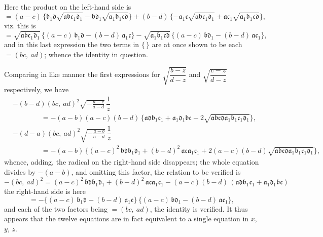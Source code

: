 \documentclass[11pt]{article}
\begin{document}
Here the product on the left-hand side is
\[ = (a-c)\,\{\mathfrak{b}_{1}\mathfrak{d}\sqrt{\mathfrak{a}\mathfrak{b}\mathfrak{c}_{1}\mathfrak{d}_{1}} - \mathfrak{b}\mathfrak{d}_{1}\sqrt{\mathfrak{a}_{1}\mathfrak{b}_{1}\mathfrak{c}\mathfrak{d}}\} + (b-d)\,\{-\mathfrak{a}_{1}\mathfrak{c}\sqrt{\mathfrak{a}\mathfrak{b}\mathfrak{c}_{1}\mathfrak{d}_{1}} + \mathfrak{a}\mathfrak{c}_{1}\sqrt{\mathfrak{a}_{1}\mathfrak{b}_{1}\mathfrak{c}\mathfrak{d}}\}, \]
viz. this is
\[ = \sqrt{\mathfrak{a}\mathfrak{b}\mathfrak{c}_{1}\mathfrak{d}_{1}}\,\{(a-c)\,\mathfrak{b}_{1}\mathfrak{d} - (b-d)\,\mathfrak{a}_{1}\mathfrak{c}\} - \sqrt{\mathfrak{a}_{1}\mathfrak{b}_{1}\mathfrak{c}\mathfrak{d}}\,\{(a-c)\,\mathfrak{b}\mathfrak{d}_{1} - (b-d)\,\mathfrak{a}\mathfrak{c}_{1}\}, \]
and in this last expression the two terms in $\{\,\}$ are at once shown to be each $= (bc,\ ad)$; whence the identity in question.

Comparing in like manner the first expressions for $\sqrt{\dfrac{b-z}{d-z}}$ and $\sqrt{\dfrac{c-z}{d-z}}$ respectively, we have
\begin{align*}
&-(b-d)(bc,\ ad)^{2}\sqrt{-\tfrac{a-c}{a-d}}\,\dfrac{1}{z}\\
&\hspace{4em}= -(a-b)(a-c)(b-d)\,\{\mathfrak{a}\mathfrak{d}\mathfrak{b}_{1}\mathfrak{c}_{1} + \mathfrak{a}_{1}\mathfrak{d}_{1}\mathfrak{b}\mathfrak{c} - 2\sqrt{\mathfrak{a}\mathfrak{b}\mathfrak{c}\mathfrak{d}\mathfrak{a}_{1}\mathfrak{b}_{1}\mathfrak{c}_{1}\mathfrak{d}_{1}}\},\\[2pt]
&-(d-a)(bc,\ ad)^{2}\sqrt{-\tfrac{a-b}{a-d}}\,\dfrac{1}{z}\\
&\hspace{4em}= -(a-b)\,\{(a-c)^{2}\,\mathfrak{b}\mathfrak{d}\mathfrak{b}_{1}\mathfrak{d}_{1} + (b-d)^{2}\,\mathfrak{a}\mathfrak{c}\mathfrak{a}_{1}\mathfrak{c}_{1} + 2(a-c)(b-d)\sqrt{\mathfrak{a}\mathfrak{b}\mathfrak{c}\mathfrak{d}\mathfrak{a}_{1}\mathfrak{b}_{1}\mathfrak{c}_{1}\mathfrak{d}_{1}}\},
\end{align*}
whence, adding, the radical on the right-hand side disappears; the whole equation divides by $-(a-b)$, and omitting this factor, the relation to be verified is
\[ -(bc,\ ad)^{2} = (a-c)^{2}\,\mathfrak{b}\mathfrak{d}\mathfrak{b}_{1}\mathfrak{d}_{1} + (b-d)^{2}\,\mathfrak{a}\mathfrak{c}\mathfrak{a}_{1}\mathfrak{c}_{1} - (a-c)(b-d)\,(\mathfrak{a}\mathfrak{d}\mathfrak{b}_{1}\mathfrak{c}_{1} + \mathfrak{a}_{1}\mathfrak{d}_{1}\mathfrak{b}\mathfrak{c}) \]
the right-hand side is here
\[ = -\{(a-c)\,\mathfrak{b}_{1}\mathfrak{d} - (b-d)\,\mathfrak{a}_{1}\mathfrak{c}\}\,\{(a-c)\,\mathfrak{b}\mathfrak{d}_{1} - (b-d)\,\mathfrak{a}\mathfrak{c}_{1}\}, \]
and each of the two factors being $= (bc,\ ad)$, the identity is verified. It thus appears that the twelve equations are in fact equivalent to a single equation in $x$, $y$, $z$.
\end{document}
